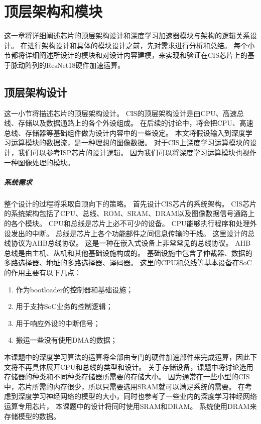
\chapter{顶层架构和模块}
这一章将详细阐述芯片的顶层架构设计和深度学习加速器模块与架构的逻辑关系设计。
在进行架构设计和具体的模块设计之前，先对需求进行分析和总结。
每个小节都将详细阐述所设计的模块和对设计内容建模，来实现和验证在CIS芯片上的基于脉动阵列的ResNet18硬件加速运算。


\section{顶层架构设计}
这一小节将描述芯片的顶层架构设计。
CIS的顶层架构设计是由CPU、高速总线、存储以及数据通路上的各个外设组成。
在后续的讨论中，将会把CPU、高速总线、存储器等基础组件做为设计内容中的一些设定。
本文将假设输入到深度学习运算模块的数据流，是一种理想的图像数据。
对于CIS上深度学习运算模块的设计，我们可以参考ISP芯片的设计逻辑。
因为我们可以将深度学习运算模块也视作一种图像处理的模块。  

\paragraph{系统需求}
整个设计的过程将采取自顶向下的策略。
首先设计CIS芯片的系统架构。
CIS芯片的系统架构包括了CPU、总线、ROM、SRAM、DRAM以及图像数据信号通路上的各个模块。
CPU和总线是芯片上必不可少的设备。
CPU能够执行程序和处理外设发出的中断。
总线是芯片上各个功能部件之间信息传输的干线。
这里设计的总线协议为AHB总线协议。
这是一种在嵌入式设备上非常常见的总线协议。
AHB总线是由主机、从机和其他基础设施构成的。
基础设施中包含了仲裁器、数据的多路选择器、地址的多路选择器、译码器。
这里的CPU和总线等基本设备在SoC的作用主要有以下几点：
\begin{enumerate}
    \item 作为bootloader的控制器和基础设施；
    \item 用于支持SoC业务的控制逻辑；
    \item 用于响应外设的中断信号；
    \item 搬运一些没有使用DMA的数据；
\end{enumerate}    

本课题中的深度学习算法的运算将全部由专门的硬件加速部件来完成运算，因此下文将不再具体展开CPU和总线的类型和设计。
关于存储设备，课题中将讨论选用存储器的种类和不同种类存储器所需要的存储大小。
因为通常在一些小型的CIS中，芯片所需的内存很少，所以只需要选用SRAM就可以满足系统的需要。
在考虑到深度学习神经网络的模型的大小，同时也参考了一些业内的深度学习神经网络运算专用芯片，
本课题中的设计将同时使用SRAM和DRAM。
系统使用DRAM来存储模型的数据。



